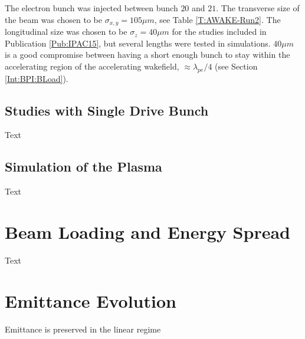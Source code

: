 The electron bunch was injected between bunch $20$ and $21$.
The transverse size of the beam was chosen to be $\sigma_{x,y}=105\unit{\mu m}$, see Table \ref{T:AWAKE-Run2}.
The longitudinal size was chosen to be $\sigma_{z}=40\unit{\mu m}$ for the studies included in Publication \ref{Pub:IPAC15}, but several lengths were tested in simulations.
$40\unit{\mu m}$ is a good compromise between having a short enough bunch to stay within the accelerating region of the accelerating wakefield, $\approx \lambda_{pe}/4$ (see Section \ref{Int:BPI:BLoad}).





\subsection{Studies with Single Drive Bunch}
\label{Sim:PBSingle}

Text


\subsection{Simulation of the Plasma}
\label{Sim:Plasma}

Text


\section{Beam Loading and Energy Spread}
\label{Sim:BLoad}

Text


\section{Emittance Evolution}
\label{Sim:Emitt}

Emittance is preserved in the linear regime

